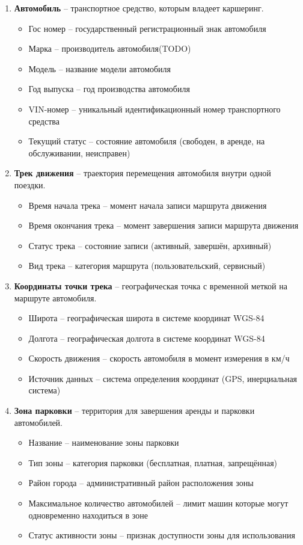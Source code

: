 \begin{enumerate}
	\item \textbf{Автомобиль} -- транспортное средство, которым владеет каршеринг.
\begin{itemize}
\item Гос номер -- государственный регистрационный знак автомобиля
\item Марка -- производитель автомобиля(TODO)
\item Модель -- название модели автомобиля
\item Год выпуска -- год производства автомобиля
\item VIN-номер -- уникальный идентификационный номер транспортного средства
\item Текущий статус -- состояние автомобиля (свободен, в аренде, на обслуживании, неисправен)
\end{itemize}

\item \textbf{Трек движения} -- траектория перемещения автомобиля внутри одной поездки.
\begin{itemize}
\item Время начала трека -- момент начала записи маршрута движения
\item Время окончания трека -- момент завершения записи маршрута движения
\item Статус трека -- состояние записи (активный, завершён, архивный)
\item Вид трека -- категория маршрута (пользовательский, сервисный)
\end{itemize}

\item \textbf{Координаты точки трека} -- географическая точка с временной меткой на маршруте автомобиля.
\begin{itemize}
\item Широта -- географическая широта в системе координат WGS-84
\item Долгота -- географическая долгота в системе координат WGS-84
\item Скорость движения -- скорость автомобиля в момент измерения в км/ч
\item Источник данных -- система определения координат (GPS, инерциальная система)
\end{itemize}

\item \textbf{Зона парковки} -- территория для завершения аренды и парковки автомобилей.
\begin{itemize}
\item Название -- наименование зоны парковки
\item Тип зоны -- категория парковки (бесплатная, платная, запрещённая)
\item Район города -- административный район расположения зоны
\item Максимальное количество автомобилей -- лимит машин которые могут одновременно находиться в зоне
\item Статус активности зоны -- признак доступности зоны для использования
\end{itemize}


\end{enumerate}
